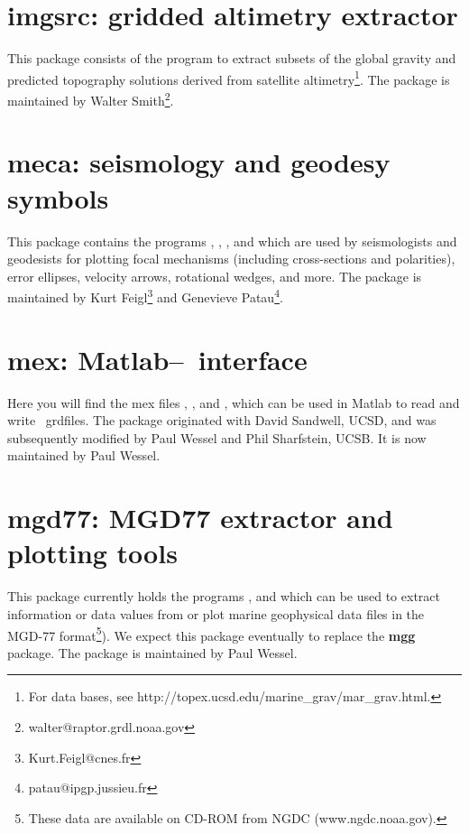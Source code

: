 \section{imgsrc: gridded altimetry extractor}

This package consists of the program  to
extract subsets of the global gravity and predicted topography
solutions derived from satellite altimetry\footnote{For data bases,
see http://topex.ucsd.edu/marine\_grav/mar\_grav.html.}.  The package
is maintained by Walter Smith\footnote{walter@raptor.grdl.noaa.gov}.

\section{meca: seismology and geodesy symbols}

This package contains the programs , ,
, and  which are used
by seismologists and geodesists for plotting focal mechanisms (including
cross-sections and polarities), error ellipses, velocity arrows, rotational
wedges, and more.  The package is maintained by
Kurt Feigl\footnote{Kurt.Feigl@cnes.fr} and
Genevieve Patau\footnote{patau@ipgp.jussieu.fr}.

\section{mex: Matlab--\gmt\ interface}

Here you will find the mex files , ,
and , which can be used in Matlab to read and write
\GMT\ grdfiles.  The package originated with David Sandwell, UCSD,
and was subsequently modified by Paul Wessel and Phil Sharfstein, UCSB.
It is now maintained by Paul Wessel.

\section{mgd77: MGD77 extractor and plotting tools}

This package currently holds the programs ,  and
 which can be
used to extract information or data values from or plot marine geophysical
data files in the MGD-77 format\footnote{These data are available on CD-ROM from NGDC
(www.ngdc.noaa.gov).}).  We expect this package eventually to replace the {\bf mgg} package.
The package is maintained by Paul Wessel.

